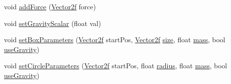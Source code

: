 \begin{DoxyCompactItemize}
\item 
void \mbox{\hyperlink{class_physics_body_a920691097ccaf25b2dea6a4fb53d9921}{add\+Force}} (\mbox{\hyperlink{class_vector2f}{Vector2f}} force)
\item 
void \mbox{\hyperlink{class_physics_body_a5975792465241daa038ff58f351a3bd0}{set\+Gravity\+Scalar}} (float val)
\item 
void \mbox{\hyperlink{class_physics_body_a2b5292f24a3ecd363230b5a13524c1de}{set\+Box\+Parameters}} (\mbox{\hyperlink{class_vector2f}{Vector2f}} start\+Pos, \mbox{\hyperlink{class_vector2f}{Vector2f}} \mbox{\hyperlink{class_physics_body_a3bb57b0ab32d6865a3e01f7a72291e38}{size}}, float \mbox{\hyperlink{class_physics_body_ad8617ab5d898b415d5fc0dc67d5ae78a}{mass}}, bool \mbox{\hyperlink{class_physics_body_a69b18d144228eccd2a82c86fcdebe9b5}{use\+Gravity}})
\item 
void \mbox{\hyperlink{class_physics_body_a8c100c20b5a7777ba0d22886ecf878fe}{set\+Circle\+Parameters}} (\mbox{\hyperlink{class_vector2f}{Vector2f}} start\+Pos, float \mbox{\hyperlink{class_physics_body_aa1942a3f85f7678d83a0670e73d9e9a5}{radius}}, float \mbox{\hyperlink{class_physics_body_ad8617ab5d898b415d5fc0dc67d5ae78a}{mass}}, bool \mbox{\hyperlink{class_physics_body_a69b18d144228eccd2a82c86fcdebe9b5}{use\+Gravity}})
\end{DoxyCompactItemize}
